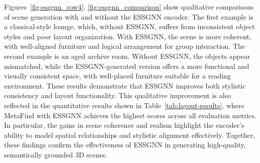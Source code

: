 \begin{table}[h]
\centering
\caption{Scene-level quality comparison across four evaluation dimensions. MetaFind (with GSSNN) achieves the highest scores across both GPT-4o and human evaluations, demonstrating superior spatial coherence and aesthetic quality in composed scenes.}
\label{tab:layout-results}
\end{table}
Figures~\ref{fig:essgnn_row4}, \ref{fig:essgnn_comparison} show qualitative comparisons of scene generation with and without the ESSGNN encoder. The first example is a classical-style lounge, which, without ESSGNN, suffers from inconsistent object styles and poor layout organization. With ESSGNN, the scene is more coherent, with well-aligned furniture and logical arrangement for group interaction. The second example is an aged archive room. Without ESSGNN, the objects appear mismatched, while the ESSGNN-generated version offers a more functional and visually consistent space, with well-placed furniture suitable for a reading environment. These results demonstrate that ESSGNN improves both stylistic consistency and layout functionality. This qualitative improvement is also reflected in the quantitative results shown in Table~\ref{tab:layout-results}, where MetaFind with ESSGNN achieves the highest scores across all evaluation metrics. In particular, the gains in scene coherence and realism highlight the encoder’s ability to model spatial relationships and stylistic alignment effectively. Together, these findings confirm the effectiveness of ESSGNN in generating high-quality, semantically grounded 3D scenes.


